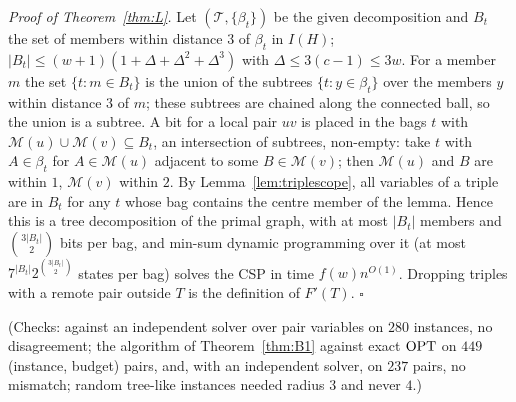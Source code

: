 \emph{Proof of Theorem~\ref{thm:L}.} Let $(\mathcal T,\{\beta_t\})$ be the given decomposition and $B_t$ the set of members within distance $3$ of $\beta_t$ in $I(H)$; $|B_t|\le(w+1)(1+\Delta+\Delta^2+\Delta^3)$ with $\Delta\le3(c-1)\le3w$. For a member $m$ the set $\{t:m\in B_t\}$ is the union of the subtrees $\{t:y\in\beta_t\}$ over the members $y$ within distance $3$ of $m$; these subtrees are chained along the connected ball, so the union is a subtree. A bit for a local pair $uv$ is placed in the bags $t$ with $\mathcal M(u)\cup\mathcal M(v)\subseteq B_t$, an intersection of subtrees, non-empty: take $t$ with $A\in\beta_t$ for $A\in\mathcal M(u)$ adjacent to some $B\in\mathcal M(v)$; then $\mathcal M(u)$ and $B$ are within $1$, $\mathcal M(v)$ within $2$. By Lemma~\ref{lem:triplescope}, all variables of a triple are in $B_t$ for any $t$ whose bag contains the centre member of the lemma. Hence this is a tree decomposition of the primal graph, with at most $|B_t|$ members and $\binom{3|B_t|}2$ bits per bag, and min-sum dynamic programming over it (at most $7^{|B_t|}2^{\binom{3|B_t|}{2}}$ states per bag) solves the CSP in time $f(w)n^{O(1)}$. Dropping triples with a remote pair outside $T$ is the definition of $F'(T)$. \hfill$\square$

(Checks: against an independent solver over pair variables on $280$ instances, no disagreement; the algorithm of Theorem~\ref{thm:B1} against exact $\mathrm{OPT}$ on $449$ (instance, budget) pairs, and, with an independent solver, on $237$ pairs, no mismatch; random tree-like instances needed radius $3$ and never $4$.)

